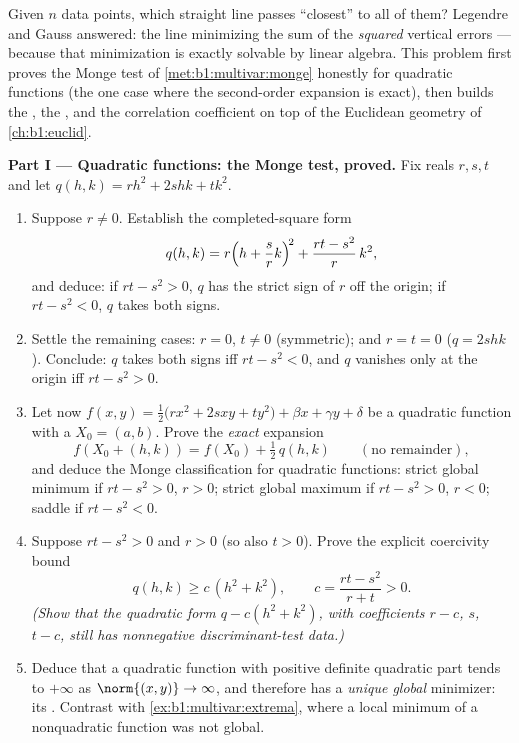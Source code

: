 \begin{problem}\label{pb:b1:multivar:1}
Given $n$ data points, which straight line passes ``closest'' to
all of them? Legendre and Gauss answered: the line minimizing the
sum of the \emph{squared} vertical errors --- because that
minimization is exactly solvable by linear algebra. This problem
first proves the Monge test of \cref{met:b1:multivar:monge}
honestly for quadratic functions (the one case where the
second-order expansion is exact), then builds the , the , and the correlation coefficient
on top of the Euclidean geometry of
\cref{ch:b1:euclid}.

\medskip
\noindent\textbf{Part I --- Quadratic functions: the Monge test,
proved.} Fix reals $r, s, t$ and let $q(h, k) = r h^2 + 2s hk +
t k^2$.
\begin{enumerate}
  \item Suppose $r \neq 0$. Establish the completed-square form
        \[
        q(h, k) = r\Bigl(h + \frac{s}{r}k\Bigr)^{\!2}
        + \frac{rt - s^2}{r}\,k^2 ,
        \]
        and deduce: if $rt - s^2 > 0$, $q$ has the strict sign
        of $r$ off the origin; if $rt - s^2 < 0$, $q$ takes both
        signs.
  \item Settle the remaining cases: $r = 0$, $t \neq 0$
        (symmetric); and $r = t = 0$ ($q = 2shk$). Conclude:
        $q$ takes both signs iff $rt - s^2 < 0$, and $q$
        vanishes only at the origin iff $rt - s^2 > 0$.
  \item Let now $f(x, y) = \frac12\bigl(r x^2 + 2s xy + t
        y^2\bigr) + \beta x + \gamma y + \delta$ be a quadratic
        function with a  $X_0 = (a, b)$. Prove the
        \emph{exact} expansion
        \[
        f(X_0 + (h,k)) = f(X_0) + \tfrac12\,q(h, k)
        \qquad (\text{no remainder}),
        \]
        and deduce the Monge classification for quadratic
        functions: strict global minimum if $rt - s^2 > 0$, $r >
        0$; strict global maximum if $rt - s^2 > 0$, $r < 0$;
        saddle if $rt - s^2 < 0$.
  \item Suppose $rt - s^2 > 0$ and $r > 0$ (so also $t > 0$).
        Prove the explicit coercivity bound
        \[
        q(h, k) \geq c\,(h^2 + k^2),
        \qquad
        c = \frac{rt - s^2}{r + t} > 0 .
        \]
        \emph{(Show that the quadratic form $q - c(h^2 + k^2)$,
        with coefficients $r - c$, $s$, $t - c$, still has
        nonnegative discriminant-test data.)}
  \item Deduce that a quadratic function with positive definite
        quadratic part tends to $+\infty$ as $\norm{(x,y)} \to
        \infty$, and therefore has a \emph{unique global}
        minimizer: its . Contrast with
        \cref{ex:b1:multivar:extrema}, where a local minimum of
        a nonquadratic function was not global.
\end{enumerate}


\end{problem}
